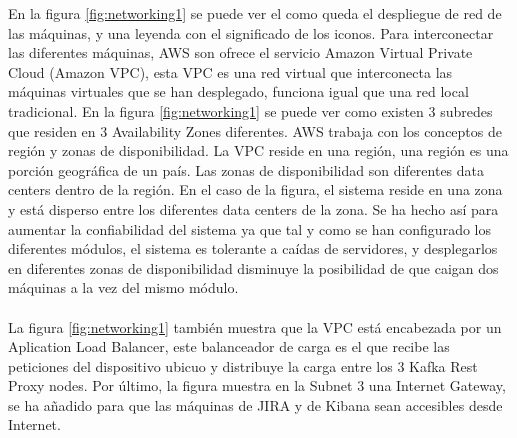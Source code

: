 En la figura \ref{fig:networking1} se puede ver el como queda el despliegue de red de las máquinas, y una leyenda con el significado de los iconos. Para interconectar las diferentes máquinas, AWS son ofrece el servicio Amazon Virtual Private Cloud (Amazon VPC), esta VPC es una red virtual que interconecta las máquinas virtuales que se han desplegado, funciona igual que una red local tradicional. En la figura \ref{fig:networking1} se puede ver como existen 3 subredes que residen en 3 Availability Zones diferentes. AWS trabaja con los conceptos de región y zonas de disponibilidad. La VPC reside en una región, una región es una porción geográfica de un país. Las zonas de disponibilidad son diferentes data centers dentro de la región. En el caso de la figura, el sistema reside en una zona y está disperso entre los diferentes data centers de la zona. Se ha hecho así para aumentar la confiabilidad del sistema ya que tal y como se han configurado los diferentes módulos, el sistema es tolerante a caídas de servidores, y desplegarlos en diferentes zonas de disponibilidad disminuye la posibilidad de que caigan dos máquinas a la vez del mismo módulo.
\\\\
La figura \ref{fig:networking1} también muestra que la VPC está encabezada por un Aplication Load Balancer, este balanceador de carga es el que recibe las peticiones del dispositivo ubicuo y distribuye la carga entre los 3 Kafka Rest Proxy nodes. Por último, la figura muestra en la Subnet 3 una Internet Gateway, se ha añadido para que las máquinas de JIRA y de Kibana sean accesibles desde Internet.


